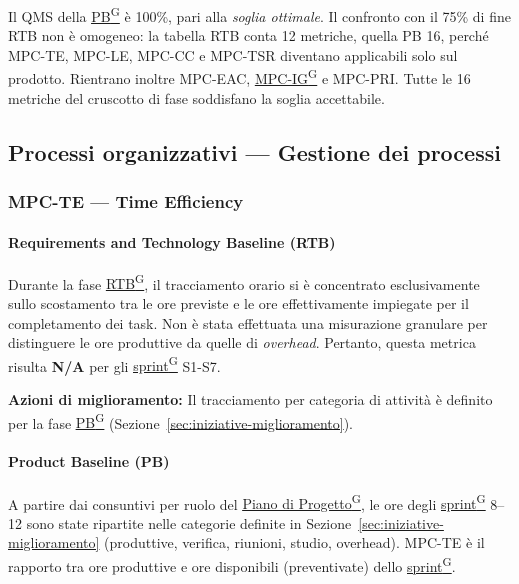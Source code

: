 \documentclass[a4paper,12pt]{article}
\providecommand{\glslink}[2]{\href{https://alittlebyte-19.github.io/Documentazione/glossario.html\#gls-#1}{\underline{#2}\textsuperscript{\scriptsize G}}}
\begin{document}
Il QMS della \glslink{pb-product-baseline}{PB} è 100\%, pari alla \emph{soglia ottimale}. Il confronto con il 75\% di fine RTB non è omogeneo: la tabella RTB conta 12 metriche, quella PB 16, perché MPC-TE, MPC-LE, MPC-CC e MPC-TSR diventano applicabili solo sul prodotto. Rientrano inoltre MPC-EAC, \glslink{indice-di-gulpease-mpc-ig}{MPC-IG} e MPC-PRI. Tutte le 16 metriche del cruscotto di fase soddisfano la soglia accettabile.

\subsection{Processi organizzativi — Gestione dei processi}

\subsubsection{MPC-TE — Time Efficiency}

\paragraph*{Requirements and Technology Baseline (RTB)} Durante la fase \glslink{rtb-requirements-and-technology-baseline}{RTB}, il tracciamento orario si è concentrato esclusivamente sullo scostamento tra le ore previste e le ore effettivamente impiegate per il completamento dei task. Non è stata effettuata una misurazione granulare per distinguere le ore produttive da quelle di \textit{overhead}. Pertanto, questa metrica risulta \textbf{N/A} per gli \glslink{sprint}{sprint} S1-S7.

\noindent\textbf{Azioni di miglioramento:} Il tracciamento per categoria di attività è definito per la fase \glslink{pb-product-baseline}{PB} (Sezione~\ref{sec:iniziative-miglioramento}).

\paragraph*{Product Baseline (PB)} A partire dai consuntivi per ruolo del \glslink{piano-di-progetto}{Piano di Progetto}, le ore degli \glslink{sprint}{sprint} 8--12 sono state ripartite nelle categorie definite in Sezione~\ref{sec:iniziative-miglioramento} (produttive, verifica, riunioni, studio, overhead). MPC-TE è il rapporto tra ore produttive e ore disponibili (preventivate) dello \glslink{sprint}{sprint}.
\end{document}
